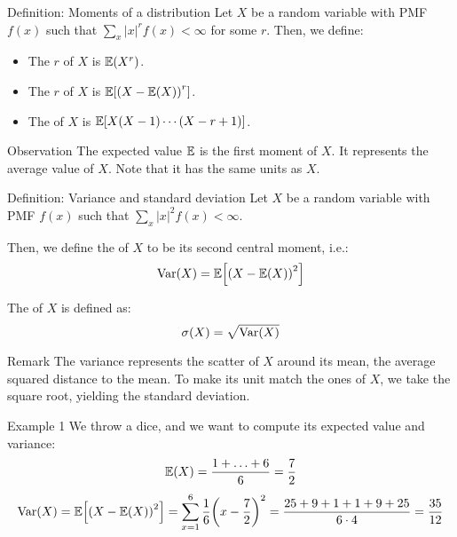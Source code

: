 \documentclass[a4paper]{article}
\begin{document}
\begin{parag}{Definition: Moments of a distribution}
    Let $X$ be a random variable with PMF $f\left(x\right)$ such that $\sum_{x}^{} \left|x\right|^r f\left(x\right) < \infty$ for some $r$. Then, we define:
    \begin{itemize}
        \item The $r$\Th {} of $X$ is $\exval\left(X^r\right)$.
        \item The $r$\Th {} of $X$ is $\exval\left[\left(X - \exval\left(X\right)\right)^r\right]$.
        \item The  of $X$ is $\exval\left[X\left(X-1\right)\cdots\left(X - r + 1\right)\right]$.
    \end{itemize}

    \begin{subparag}{Observation}
        The expected value $\mathbb{E}$ is the first moment of $X$. It represents the average value of $X$. Note that it has the same units as $X$.
    \end{subparag}
\end{parag}

\begin{parag}{Definition: Variance and standard deviation}
    Let $X$ be a random variable with PMF $f\left(x\right)$ such that $\sum_{x}^{} \left|x\right|^2 f\left(x\right) < \infty$.

    Then, we define the  of $X$ to be its second central moment, i.e.: 
    \[\Var\left(X\right) = \exval\left[\left(X - \exval\left(X\right)\right)^2\right]\]
    
    The  of $X$ is defined as: 
    \[\sigma\left(X\right) = \sqrt{\Var\left(X\right)}\]

    \begin{subparag}{Remark}
        The variance represents the scatter of $X$ around its mean, the average squared distance to the mean. To make its unit match the ones of $X$, we take the square root, yielding the standard deviation.
    \end{subparag}
\end{parag}

\begin{parag}{Example 1}
    We throw a dice, and we want to compute its expected value and variance: 
    \[\exval\left(X\right) = \frac{1 + \ldots + 6}{6} = \frac{7}{2}\]
    \[\Var\left(X\right) = \exval\left[\left(X - \exval\left(X\right)\right)^2\right]= \sum_{x=1}^{6}  \frac{1}{6}\left(x - \frac{7}{2}\right)^2 = \frac{25 + 9 + 1 + 1 + 9 + 25}{6\cdot 4} = \frac{35}{12}\]

\end{parag}
\end{document}
